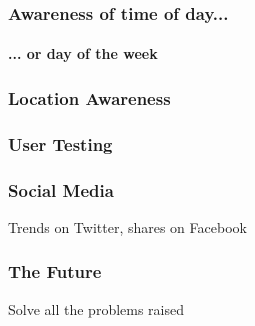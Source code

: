 \documentclass{beamer}
\begin{document}
\begin{frame}
  \frametitle{Awareness of time of day...}
  \framesubtitle{... or day of the week}
\end{frame}

\begin{frame}
  \frametitle{Location Awareness}
\end{frame}

\begin{frame}
  \frametitle{User Testing}
\end{frame}

\begin{frame}
  \frametitle{Social Media}
  Trends on Twitter, shares on Facebook
\end{frame}

\begin{frame}
  \frametitle{The Future}
  Solve all the problems raised
\end{frame}
\end{document}
